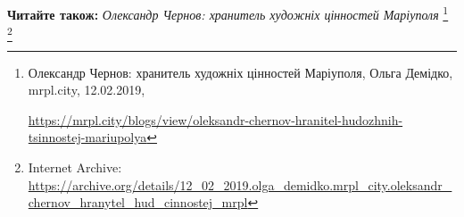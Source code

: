  
 
 
 
 

\textbf{Читайте також:} \emph{Олександр Чернов: хранитель художніх цінностей Маріуполя}%
\footnote{Олександр Чернов: хранитель художніх цінностей Маріуполя, Ольга Демідко, mrpl.city, 12.02.2019, \par%
\url{https://mrpl.city/blogs/view/oleksandr-chernov-hranitel-hudozhnih-tsinnostej-mariupolya}%
} %
\footnote{Internet Archive: \url{https://archive.org/details/12_02_2019.olga_demidko.mrpl_city.oleksandr_chernov_hranytel_hud_cinnostej_mrpl}}
